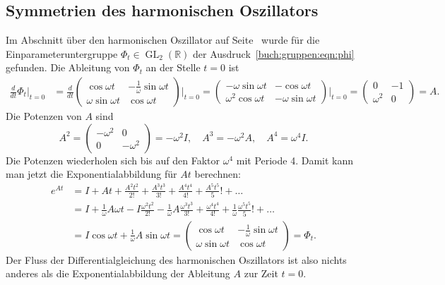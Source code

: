 \subsection{Symmetrien des harmonischen Oszillators
\label{buch:gruppen:symmetrien-harm-osz}}
Im Abschnitt über den harmonischen Oszillator
auf Seite~\pageref{buch:gruppen:harmonischer-oszillator}
wurde für die Einparameteruntergruppe
$\Phi_t\in\operatorname{GL}_2(\mathbb{R})$ der
Ausdruck~\eqref{buch:gruppen:eqn:phi} gefunden.
Die Ableitung von $\Phi_t$ an der Stelle $t=0$ ist
\begin{align*}
\frac{d}{dt}\Phi_t\bigg|_{t=0}
&=
\frac{d}{dt}
\begin{pmatrix}
\cos\omega t&-\frac{1}{\omega}\sin\omega t\\
\omega\sin\omega t&\cos\omega t
\end{pmatrix}
\bigg|_{t=0}
=
\begin{pmatrix}
-\omega\sin\omega t&-\cos\omega t\\
\omega^2\cos\omega t&-\omega\sin\omega t
\end{pmatrix}
\bigg|_{t=0}
=
\begin{pmatrix}
0&-1\\\omega^2&0
\end{pmatrix}
=
A.
\end{align*}
Die Potenzen von $A$ sind
\[
A^2
=
\begin{pmatrix} -\omega^2&0\\0&-\omega^2\end{pmatrix}
=
-\omega^2 I,
\quad
A^3
=
-\omega^2 A,
\quad
A^4
=
\omega^4 I.
\]
Die Potenzen wiederholen sich bis auf den Faktor $\omega^4$ mit Periode 4.
Damit kann man jetzt die Exponentialabbildung für $At$ berechnen:
\begin{align*}
e^{At}
&=
I+At+\frac{A^2t^2}{2!}+\frac{A^3t^3}{3!}+\frac{A^4t^4}{4!}+\frac{A^5t^5}5!+\dots
\\
&=
I+\frac{1}{\omega}A\omega t-I\frac{\omega^2t^2}{2!}
-\frac1{\omega}A\frac{\omega^3t^3}{3!}
+\frac{\omega^4t^4}{4!}
+\frac{1}{\omega}\frac{\omega^5t^5}5!+\dots
\\
&= I\cos\omega t + \frac1{\omega}A\sin\omega t
=
\begin{pmatrix}
\cos\omega t       &-\frac{1}{\omega}\sin\omega t\\
\omega\sin\omega t & \cos\omega t
\end{pmatrix} = \Phi_t.
\end{align*}
Der Fluss der Differentialgleichung des harmonischen Oszillators ist
also nichts anderes als die Exponentialabbildung der Ableitung $A$ zur
Zeit $t=0$.

